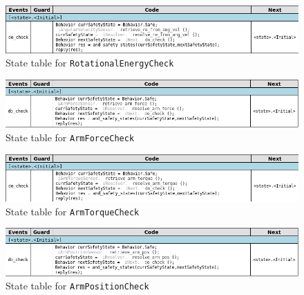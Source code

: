 \documentclass[12pt]{scrreprt}
\begin{document}
\begin{figure}[H]
    \centering
    \includegraphics[width=\textwidth]{Figures/results/modelling_figures/RotationalEnergyCheck/RotationalEnergyCheck_state_table.png}
    \caption{State table for \texttt{RotationalEnergyCheck}}
    \label{fig:RotationalEnergyCheck_state_table}
\end{figure}

\begin{figure}[H]
    \centering
    \includegraphics[width=\textwidth]{Figures/results/modelling_figures/ArmForceCheck/ArmForceCheck_state_table.png}
    \caption{State table for \texttt{ArmForceCheck}}
    \label{fig:ArmForceCheck_state_table}
\end{figure}

\begin{figure}[H]
    \centering
    \includegraphics[width=\textwidth]{Figures/results/modelling_figures/ArmTorqueCheck/ArmTorqueCheck_state_table.png}
    \caption{State table for \texttt{ArmTorqueCheck}}
    \label{fig:ArmTorqueCheck_state_table}
\end{figure}

\begin{figure}[H]
    \centering
    \includegraphics[width=\textwidth]{Figures/results/modelling_figures/ArmPositionCheck/ArmPositionCheck_state_table.png}
    \caption{State table for \texttt{ArmPositionCheck}}
    \label{fig:ArmPositionCheck_state_table}
\end{figure}
\end{document}
